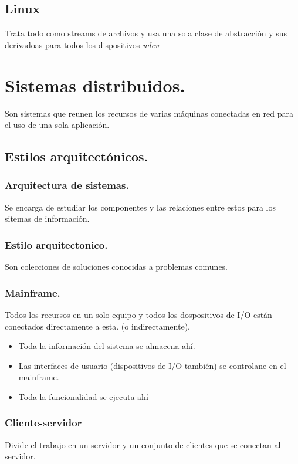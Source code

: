 \chapter{Linux}
Trata todo como streams de archivos y usa una sola clase de abstracci\'{o}n y sus derivadoas para todos los dispositivos \textit{udev}

\part{Sistemas distribuidos.}
Son sistemas que reunen los recursos de varias m\'{a}quinas conectadas en red para el uso de una sola aplicaci\'{o}n.
\chapter{Estilos arquitect\'{o}nicos.}

\section{Arquitectura de sistemas.}
Se encarga de estudiar los componentes y las relaciones entre estos para los sitemas de informaci\'{o}n.\\

\section{Estilo arquitectonico.}
Son colecciones de soluciones conocidas a problemas comunes.\\

\section{Mainframe.}
Todos los recursos en un solo equipo y todos los dospositivos de I/O est\'{a}n conectados directamente a esta. (o indirectamente).
\begin{itemize}
	\item Toda la informaci\'{o}n del sistema se almacena ah\'{i}.
	\item Las interfaces de usuario (dispositivos de I/O tambi\'{e}n) se controlane en el mainframe.
	\item Toda la funcionalidad se ejecuta ah\'{i}
\end{itemize}

\section{Cliente-servidor}
Divide el trabajo en un servidor y un conjunto de clientes que se conectan al servidor.\\
